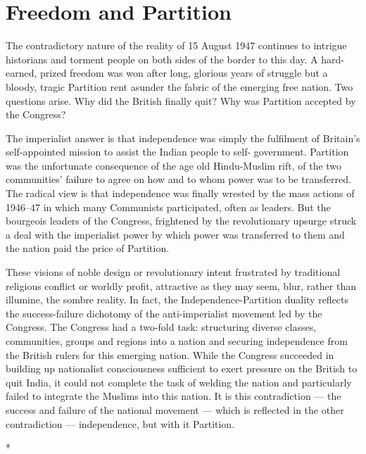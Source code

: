
\chapter{Freedom and Partition}

The contradictory nature of the reality of 15 August 1947 continues to intrigue historians and torment people on both sides of the border to this day. A hard-earned, prized freedom was won after long, glorious years of struggle but a bloody, tragic Partition rent asunder the fabric of the emerging free nation. Two questions arise. Why did the British finally quit? Why was Partition accepted by the Congress? 

The imperialist answer is that independence was simply the fulfilment of Britain's self-appointed mission to assist the Indian people to self- government. Partition was the unfortunate consequence of the age old Hindu-Muslim rift, of the two communities' failure to agree on how and to whom power was to be transferred. The radical view is that independence was finally wrested by the mass actions of 1946--47 in which many Communists participated, often as leaders. But the bourgeois leaders of the Congress, frightened by the revolutionary upsurge struck a deal with the imperialist power by which power was transferred to them and the nation paid the price of Partition. 

These visions of noble design or revolutionary intent frustrated by traditional religious conflict or worldly profit, attractive as they may seem, blur, rather than illumine, the sombre reality. In fact, the Independence-Partition duality reflects the success-failure dichotomy of the anti-imperialist movement led by the Congress. The Congress had a two-fold task: structuring diverse classes, communities, groups and regions into a nation and securing independence from the British rulers for this emerging nation. While the Congress succeeded in building up nationalist consciousness sufficient to exert pressure on the British to quit India, it could not complete the task of welding the nation and particularly failed to integrate the Muslims into this nation. It is this contradiction --- the success and failure of the national movement --- which is reflected in the other contradiction --- independence, but with it Partition.

\begin{center}*\end{center}

\paragraph*{}

